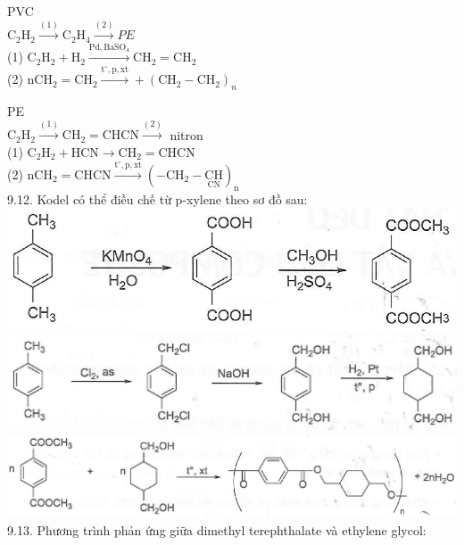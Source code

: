 \documentclass[10pt]{article}
\begin{document}
PVC\\
$\mathrm{C}_{2} \mathrm{H}_{2} \xrightarrow{(1)} \mathrm{C}_{2} \mathrm{H}_{4} \xrightarrow{(2)} P E$\\
(1) $\mathrm{C}_{2} \mathrm{H}_{2}+\mathrm{H}_{2} \xrightarrow{\mathrm{Pd}, \mathrm{BaSO}_{4}} \mathrm{CH}_{2}=\mathrm{CH}_{2}$\\
(2) $\mathrm{nCH}_{2}=\mathrm{CH}_{2} \xrightarrow{\mathrm{t}^{\circ}, \mathrm{p}, \mathrm{xt}}+\left(\mathrm{CH}_{2}-\mathrm{CH}_{2}\right)_{n}$

PE\\
$\mathrm{C}_{2} \mathrm{H}_{2} \xrightarrow{(1)} \mathrm{CH}_{2}=\mathrm{CHCN} \xrightarrow{(2)}$ nitron\\
(1) $\mathrm{C}_{2} \mathrm{H}_{2}+\mathrm{HCN} \longrightarrow \mathrm{CH}_{2}=\mathrm{CHCN}$\\
(2) $\mathrm{nCH}_{2}=\mathrm{CHCN} \xrightarrow{\mathrm{t}^{\circ}, \mathrm{p}, \mathrm{xt}}\left(-\mathrm{CH}_{2}-\underset{\mathrm{CN}}{\mathrm{CH}}\right)_{\mathrm{n}}$\\
9.12. Kodel có thể điều chế từ p-xylene theo sơ đồ sau:\\
\includegraphics[max width=\textwidth, center]{2025_10_23_b4e16b74380d0f7e7700g-062(1)}\\
\includegraphics[max width=\textwidth, center]{2025_10_23_b4e16b74380d0f7e7700g-062}\\
\includegraphics[max width=\textwidth, center]{2025_10_23_b4e16b74380d0f7e7700g-062(2)}\\
9.13. Phương trình phản ứng giữa dimethyl terephthalate và ethylene glycol:\\
\end{document}
